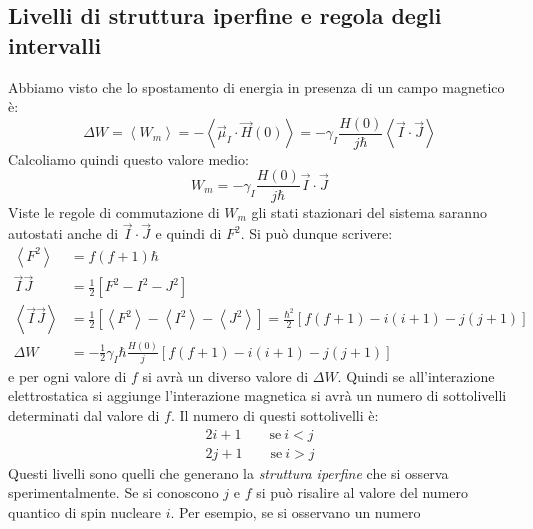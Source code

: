 \subsection{Livelli di struttura iperfine e regola degli intervalli}
Abbiamo  visto che lo spostamento di energia in presenza
di un campo magnetico è:
\begin{equation}
\Delta W = \left \langle W_m \right \rangle = -\left \langle \vec{\mu}_I \cdot 
\vec{H}{(0)} \right \rangle = -\gamma_I \frac{H{(0)}}{j \hbar} \left \langle 
\vec{I} \cdot \vec{J} \right \rangle
\end{equation}
Calcoliamo quindi questo valore medio:
\begin{equation}
W_m =  -\gamma_I \frac{H{(0)}}{j \hbar} \vec{I} \cdot \vec{J}
\end{equation}
Viste le regole di commutazione di $W_m$ gli stati stazionari del sistema
saranno autostati anche di $\vec{I}\cdot\vec{J}$ e quindi di $F^2$.
Si può dunque scrivere:
\begin{equation}\begin{split}
\left \langle F^2 \right \rangle &= f (f+1) \hbar\\
\vec{I}\vec{J} &= \frac{1}{2}\left [ F^2 - I^2 - J^2 \right ]\\
\left \langle \vec{I} \vec{J} \right \rangle &= \frac{1}{2} \left [ \left
\langle F^2 \right \rangle - \left \langle I^2 \right \rangle - \left \langle
J^2 \right \rangle \right ] = \frac{\hbar^2}{2} \left [ f(f+1) - i(i+1) - j(j+1)
\right ]\\
\Delta W &= -\frac{1}{2} \gamma_I \hbar \frac{H{(0)}}{j} \left [ f(f+1) - i(i+1)
- j(j+1) \right ]
\end{split}\end{equation}
e per ogni valore di $f$ si avrà un diverso valore di $\Delta W$. Quindi se
all'interazione elettrostatica si aggiunge l'interazione magnetica si avrà un
numero di sottolivelli determinati dal valore di $f$. Il numero di questi
sottolivelli è:
\begin{equation}\begin{split}
2i + 1 \qquad \text{se}\ i<j\\
2j + 1 \qquad \text{se}\ i>j
\end{split}\end{equation}
Questi livelli sono quelli che generano la \textit{struttura iperfine} che si
osserva sperimentalmente. Se si conoscono $j$ e $f$ si può risalire al valore
del numero quantico di spin nucleare $i$. Per esempio, se si osservano un numero
